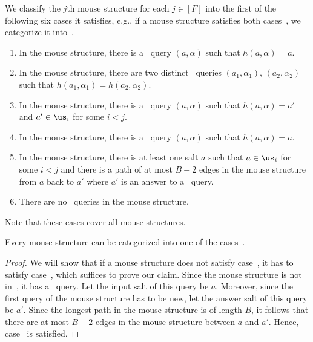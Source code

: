 We classify the $j$th mouse structure for each $j\in[F]$ into the first of the following six cases it satisfies, e.g., if a mouse structure satisfies both cases~, we categorize it into~. 
\begin{enumerate}
\item \label{case:newsl}In the mouse structure, there is a \new\ query $(a,\alpha)$ such that $h(a,\alpha)=a$.
\item \label{case:newcol}In the mouse structure, there are two distinct \new\ queries $(a_1,\alpha_1)$, $(a_2,\alpha_2)$ such that $h(a_1,\alpha_1)=h(a_2,\alpha_2)$.
\item \label{case:repnew}In the mouse structure, there is a \new\ query $(a,\alpha)$ such that $h(a,\alpha)=a'$ and $a'\in \us_i$ for some $i<j$. 
\item \label{case:oldsl}In the mouse structure, there is a \urep\ query $(a,\alpha)$ such that $h(a,\alpha)=a$. 
\item \label{case:somerep}In the mouse structure, there is at least one salt $a$ such that $a\in \us_i$ for some $i<j$ and there is a path of at most $B-2$ edges in the mouse structure from $a$ back to $a'$ where $a'$ is an answer to a \new\ query.
\item \label{case:norep}There are no \frep\ queries in the mouse structure.
\end{enumerate}
Note that these cases cover all mouse structures.
\begin{myclaim}
  Every mouse structure can be categorized into one of the cases~.
\end{myclaim}
\begin{proof}
  We will show that if a mouse structure does not satisfy case~, it has to satisfy case~, which suffices to prove our claim. Since the mouse structure is not in~, it has a \frep\ query. Let the input salt of this query be $a$. Moreover, since the first query of the mouse structure has to be new, let the answer salt of this query be $a'$. Since the longest path in the mouse structure is of length $B$, it follows that there are at most $B-2$ edges in the mouse structure between $a$ and $a'$. Hence, case~ is satisfied.
\end{proof}

